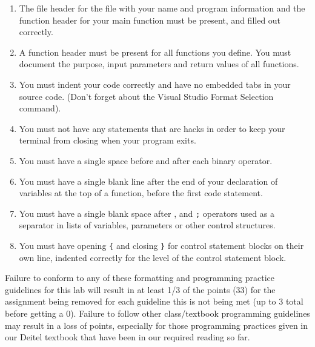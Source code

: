 \documentclass[11pt]{article}
\begin{document}
\begin{enumerate}
\item The file header for the file with your name and program information
  and the function header for your main function must be present, and
  filled out correctly.
\item A function header must be present for all functions you define.
  You must document the purpose, input parameters and return values
  of all functions.
\item You must indent your code correctly and have no embedded tabs in
  your source code. (Don't forget about the Visual Studio Format
  Selection command).
\item You must not have any statements that are hacks in order to keep
  your terminal from closing when your program exits.
\item You must have a single space before and after each binary operator.
\item You must have a single blank line after the end of your declaration
  of variables at the top of a function, before the first code
  statement.
\item You must have a single blank space after , and \verb~;~ operators used as a
  separator in lists of variables, parameters or other control
  structures.
\item You must have opening \verb~{~ and closing \verb~}~ for control statement blocks
  on their own line, indented correctly for the level of the control
  statement block.
\end{enumerate}

Failure to conform to any of these formatting and programming practice
guidelines for this lab will result in at least 1/3 of the points (33)
for the assignment being removed for each guideline this is not being
met (up to 3 total before getting a 0).  Failure to follow other
class/textbook programming guidelines may result in a loss of points,
especially for those programming practices given in our Deitel
textbook that have been in our required reading so far.
\end{document}
